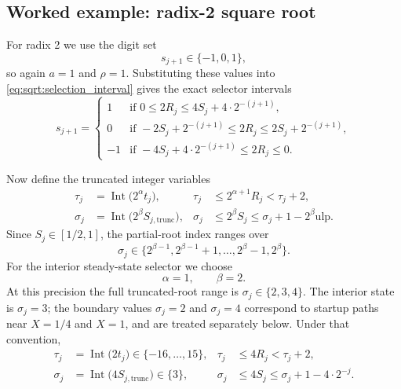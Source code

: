 \documentclass[11pt]{article}
\DeclareMathOperator{\Int}{Int}
\newcommand{\ulp}{\mathrm{ulp}}
\numberwithin{equation}{section}
\begin{document}
\subsection{Worked example: radix-2 square root}
\label{ssec:sqrt:radix2}

For radix 2 we use the digit set
\[
  s_{j+1} \in \{-1,0,1\},
\]
so again $a=1$ and $\rho=1$.
Substituting these values into \cref{eq:sqrt:selection_interval} gives the exact selector intervals
\begin{equation}
  \label{eq:sqrt:radix2_intervals}
  s_{j+1} =
  \begin{cases}
    1  & \text{if } 0 \le 2R_j \le 4S_j + 4\cdot 2^{-(j+1)}, \\
    0  & \text{if } -2S_j + 2^{-(j+1)} \le 2R_j \le 2S_j + 2^{-(j+1)}, \\
    -1 & \text{if } -4S_j + 4\cdot 2^{-(j+1)} \le 2R_j \le 0.
  \end{cases}
\end{equation}

Now define the truncated integer variables
\begin{align}
  \label{eq:sqrt:radix2_tau_def}
  \tau_j &= \Int\bigl(2^{\alpha}t_j\bigr),
  &
  \tau_j &\le 2^{\alpha+1}R_j < \tau_j+2, \\
  \label{eq:sqrt:radix2_sigma_def}
  \sigma_j &= \Int\bigl(2^{\beta}S_{j,\text{trunc}}\bigr),
  &
  \sigma_j &\le 2^{\beta}S_j \le \sigma_j + 1 - 2^{\beta}\ulp.
\end{align}
Since $S_j \in [1/2,1]$, the partial-root index ranges over
\begin{equation}
  \label{eq:sqrt:radix2_sigma_range}
  \sigma_j \in \{2^{\beta-1},2^{\beta-1}+1,\dotsc,2^{\beta}-1,2^{\beta}\}.
\end{equation}
For the interior steady-state selector we choose
\begin{equation}
  \label{eq:sqrt:radix2_alpha_beta_choice}
  \alpha = 1,
  \qquad
  \beta = 2.
\end{equation}
At this precision the full truncated-root range is $\sigma_j \in \{2,3,4\}$.
The interior state is $\sigma_j=3$; the boundary values $\sigma_j=2$ and $\sigma_j=4$ correspond to
startup paths near $X=1/4$ and $X=1$, and are treated separately below.
Under that convention,
\begin{align}
  \label{eq:sqrt:radix2_tau_val}
  \tau_j &= \Int\bigl(2t_j\bigr) \in \{-16,\dotsc,15\},
  &
  \tau_j &\le 4R_j < \tau_j+2, \\
  \label{eq:sqrt:radix2_sigma_val}
  \sigma_j &= \Int\bigl(4S_{j,\text{trunc}}\bigr) \in \{3\},
  &
  \sigma_j &\le 4S_j \le \sigma_j + 1 - 4\cdot 2^{-j}.
\end{align}
\end{document}
